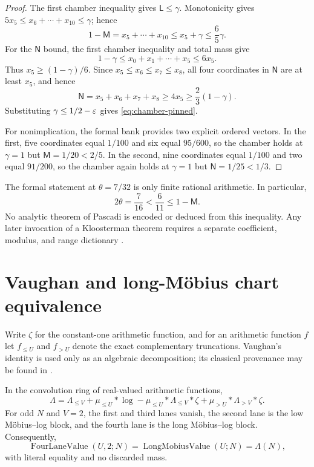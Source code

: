\begin{proof}
The first chamber inequality gives $\mathsf L\le\gamma$.  Monotonicity gives
$5x_5\le x_6+\cdots+x_{10}\le\gamma$; hence
\[
 1-\mathsf M=x_5+\cdots+x_{10}\le x_5+\gamma
          \le\frac65\gamma.
\]
For the $\mathsf N$ bound, the first chamber inequality and total mass give
\[
       1-\gamma\le x_0+x_1+\cdots+x_5\le6x_5.
\]
Thus $x_5\ge(1-\gamma)/6$.  Since
$x_5\le x_6\le x_7\le x_8$, all four coordinates in $\mathsf N$ are at least
$x_5$, and hence
\[
       \mathsf N=x_5+x_6+x_7+x_8
          \ge4x_5\ge\frac23(1-\gamma).
\]
Substituting $\gamma\le1/2-\varepsilon$ gives \cref{eq:chamber-pinned}.

For nonimplication, the formal bank provides two explicit ordered vectors.  In
the first, five coordinates equal $1/100$ and six equal $95/600$, so the chamber
holds at $\gamma=1$ but $\mathsf M=1/20<2/5$.  In the second, nine coordinates
equal $1/100$ and two equal $91/200$, so the chamber again holds at $\gamma=1$
but $\mathsf N=1/25<1/3$.
\end{proof}

\begin{remark}
The formal statement at $\theta=7/32$ is only finite rational arithmetic.  In
particular,
\[
                 2\theta=\frac7{16}<\frac6{11}\le1-\mathsf M.
\]
No analytic theorem of Pascadi is encoded or deduced from this inequality.  Any
later invocation of a Kloosterman theorem requires a separate coefficient,
modulus, and range dictionary \cite{Pascadi2025}.
\end{remark}

\section{Vaughan and long-M\"obius chart equivalence}\label{sec:vaughan}

Write $\zeta$ for the constant-one arithmetic function, and for an arithmetic
function $f$ let $f_{\le U}$ and $f_{>U}$ denote the exact complementary
truncations.  Vaughan's identity is used only as an algebraic decomposition;
its classical provenance may be found in \cite{Vaughan1997}.

\begin{theorem}[Exact four-lane identity and $V=2$ chart equivalence]\label{thm:vaughan}
In the convolution ring of real-valued arithmetic functions,
\begin{equation}\label{eq:vaughan}
 \Lambda
 =\Lambda_{\le V}+\mu_{\le U}*\log
  -\mu_{\le U}*\Lambda_{\le V}*\zeta
  +\mu_{>U}*\Lambda_{>V}*\zeta.
\end{equation}
For odd $N$ and $V=2$, the first and third lanes vanish, the second lane is the
low M\"obius--log block, and the fourth lane is the long M\"obius--log block.
Consequently,
\begin{equation}\label{eq:chart-equivalence}
       \operatorname{FourLaneValue}(U,2;N)
       =\operatorname{LongMobiusValue}(U;N)
       =\Lambda(N),
\end{equation}
with literal equality and no discarded mass.
\end{theorem}

